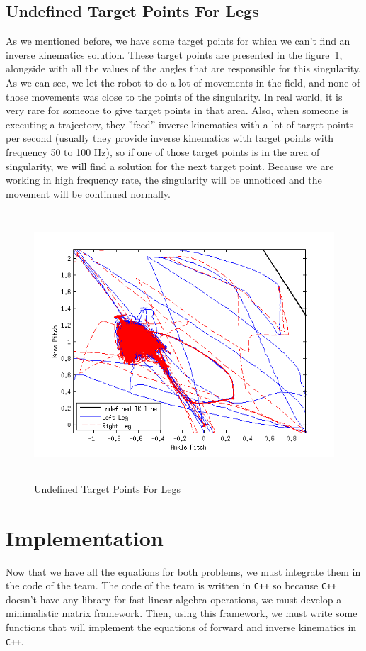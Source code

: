 \subsection{Undefined Target Points For Legs}
\label{undefined}
As we mentioned before, we have some target points for which we can't find an inverse kinematics solution. These target points are presented in the figure~\ref{fig:undefined}, alongside with all the values of the angles that are responsible for this singularity. As we can see, we let the robot to do a lot of movements in the field, and none of those movements was close to the points of the singularity. In real world, it is very rare for someone to give target points in that area. Also, when someone is executing a trajectory, they ''feed'' inverse kinematics with a lot of target points per second (usually they provide inverse kinematics with target points with frequency 50 to 100 Hz), so if one of those target points is in the area of singularity, we will find a solution for the next target point. Because we are working in high frequency rate, the singularity will be unnoticed and the movement will be continued normally.

\begin{figure}[h]
	\begin{center}
		\includegraphics[height = 10cm]{Figures/undefined.png}
 		\caption{Undefined Target Points For Legs}
 		\label{fig:undefined}
	\end{center}
\end{figure}


\section{Implementation}
Now that we have all the equations for both problems, we must integrate them in the code of the team. The code of the team is written in \verb!C++! so because \verb!C++! doesn't have any library for fast linear algebra operations, we must develop a minimalistic matrix framework. Then, using this framework, we must write some functions that will implement the equations of forward and inverse kinematics in \verb!C++!.

